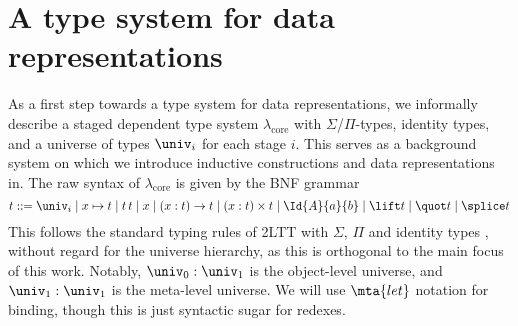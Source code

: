 \section{A type system for data representations}\label{sec:type-system}

\newcommand{\lambdacore}{\lambda_{\text{core}}}
\newcommand{\lambdaprim}{\lambda_{\text{prim}}}
\newcommand{\seq}[2]{[#1; #2]}

As a first step towards a type system for data representations, we informally
describe a staged dependent type system $\lambdacore$ with
$\Sigma$/$\Pi$-types, identity types, and a universe of types $\univ_i$ for
each stage $i$. This serves as a background system on which we introduce
inductive constructions and data representations in. The raw syntax of
$\lambdacore$ is given by the BNF grammar
\[
  t ::= \univ_i \mid x \mapsto t \mid t \, t \mid x \mid (x : t) \to t \mid (x : t) \times t \mid
  \Id{A}{a}{b} \mid \lift t \mid \quot t \mid \splice t
\]
This follows the standard typing rules of 2LTT with $\Sigma$, $\Pi$ and
identity types \cite{Kovacs2022-vb}, without regard for the universe hierarchy,
as this is orthogonal to the main focus of this work. Notably, $\univ_0 :
  \univ_1$ is the object-level universe, and $\univ_1 : \univ_1$ is the
meta-level universe. We will use $\mta{let}$ notation for binding, though this
is just syntactic sugar for redexes.

